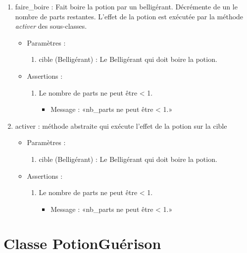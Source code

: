 \documentclass[12pt,pdftex,oneside]{article}
\begin{document}
\begin{itemize}
    \begin{enumerate}
  \item faire\_boire : Fait boire la potion par un belligérant. Décrémente de
    un le nombre de parts restantes. L'effet de la potion est exécutée par la méthode \emph{activer} des sous-classes.
    \begin{itemize}
    \item Paramètres : 
      \begin{enumerate}
      \item cible (Belligérant) : Le Belligérant qui doit boire la potion.
      \end{enumerate}
      \item Assertions : 
        \begin{enumerate}
        \item Le nombre de parts ne peut être < 1.
          \begin{itemize}
          \item Message : «nb\_parts ne peut être < 1.»
          \end{itemize}
        \end{enumerate}
    \end{itemize}

    \item activer : méthode abstraite qui exécute l'effet de la potion sur la cible
      \begin{itemize}
    \item Paramètres : 
      \begin{enumerate}
      \item cible (Belligérant) : Le Belligérant qui doit boire la potion.
      \end{enumerate}
      \item Assertions : 
        \begin{enumerate}
        \item Le nombre de parts ne peut être < 1.
          \begin{itemize}
          \item Message : «nb\_parts ne peut être < 1.»
          \end{itemize}
        \end{enumerate}
    \end{itemize}

    \end{enumerate}
  \end{itemize}


  \section {Classe PotionGuérison}
\end{document}
